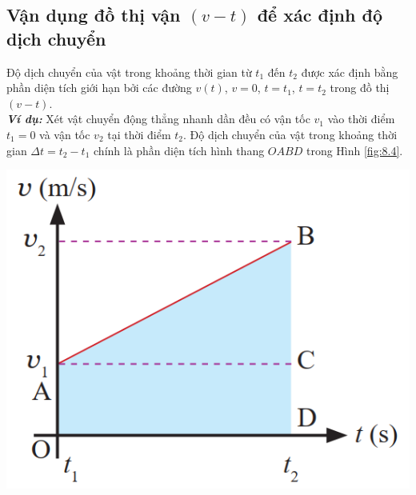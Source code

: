 \subsection{Vận dụng đồ thị vận $(v - t)$ để xác định độ dịch chuyển}
Độ dịch chuyển của vật trong khoảng thời gian từ $t_1$ đến $t_2$ được xác định bằng phần diện tích giới hạn bởi các đường $v\left(t\right)$, $v=0$, $t=t_1$, $t=t_2$ trong đồ thị $\left(v - t\right)$.\\
\textbf{\textit{Ví dụ:}} Xét vật chuyển động thẳng nhanh dần đều có vận tốc $v_1$ vào thời điểm $t_1=0$ và vận tốc $v_2$ tại thời điểm $t_2$. Độ dịch chuyển của vật trong khoảng thời gian $\Delta t= t_2-t_1$ chính là phần diện tích hình thang $OABD$ trong Hình \ref{fig:8.4}.
\begin{center}
	\includegraphics[width=0.3\linewidth]{../figs/VN10-2023-PH-TP008-4}
	\label{fig:8.4}
\end{center}
